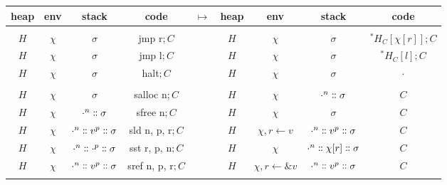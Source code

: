 \begin{xltabular}{\textwidth}{*{4}{>{\scriptsize}c}>{\tiny\bfseries}Y*{4}{>{\scriptsize}c}}
  \toprule
  {\footnotesize \bfseries heap} & {\footnotesize \bfseries env} & {\footnotesize \bfseries stack} & {\footnotesize \bfseries code} & $\mapsto$ & {\footnotesize \bfseries heap} & {\footnotesize \bfseries env} & {\footnotesize \bfseries stack} & {\footnotesize \bfseries code} \\
  \midrule \endhead

   \\



  $H$ & $\chi$ & $\sigma$ & jmp r$; C$ &  & $H$ & $\chi$ & $\sigma$ & ${}^{\ast}H_{C}[\chi[r]]; C$ \\
  $H$ & $\chi$ & $\sigma$ & jmp l$; C$ &  & $H$ & $\chi$ & $\sigma$ & ${}^{\ast}H_{C}[l]; C$ \\

  $H$ & $\chi$ & $\sigma$ & halt$; C$ &  & $H$ & $\chi$ & $\sigma$ & $\cdot$ \\

  \midrule

   \\

  $H$ & $\chi$ & $\sigma$ & salloc n$; C$ &  & $H$ & $\chi$ & $\cdot^{n}\dblcolon\sigma$ & $C$ \\
  $H$ & $\chi$ & $\cdot^{n}\dblcolon\sigma$ & sfree n$; C$ &  & $H$ & $\chi$ & $\sigma$ & $C$ \\
  $H$ & $\chi$ & $\cdot^{n}\dblcolon v^{p}\dblcolon\sigma$ & sld n, p, r$; C$ &  & $H$ & $\chi, r \gets v$ & $\cdot^{n}\dblcolon v^{p}\dblcolon\sigma$ & $C$ \\
  $H$ & $\chi$ & $\cdot^{n}\dblcolon\cdot^{p}\dblcolon\sigma$ & sst r, p, n$; C$ &  & $H$ & $\chi$ & $\cdot^{n}\dblcolon\chi[r]\dblcolon\sigma$ & $C$ \\
  $H$ & $\chi$ & $\cdot^{n}\dblcolon v^{p}\dblcolon\sigma$ & sref n, p, r$; C$ &  & $H$ & $\chi, r \gets \&v$ & $\cdot^{n}\dblcolon v^{p}\dblcolon\sigma$ & $C$ \\

  \midrule

   \\


\end{xltabular}
